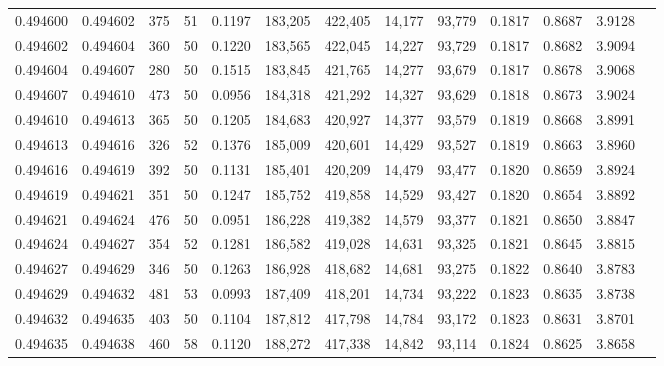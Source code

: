 \begin{tabular}{rrrrrrrrrrrrr}
0.494600 & 0.494602 &   375 &  51 &                                     0.1197 & 183,205 & 422,405 &  14,177 &  93,779 & 0.1817 & 0.8687 & 3.9128 \\
0.494602 & 0.494604 &   360 &  50 &                                     0.1220 & 183,565 & 422,045 &  14,227 &  93,729 & 0.1817 & 0.8682 & 3.9094 \\
0.494604 & 0.494607 &   280 &  50 &                                     0.1515 & 183,845 & 421,765 &  14,277 &  93,679 & 0.1817 & 0.8678 & 3.9068 \\
0.494607 & 0.494610 &   473 &  50 &                                     0.0956 & 184,318 & 421,292 &  14,327 &  93,629 & 0.1818 & 0.8673 & 3.9024 \\
0.494610 & 0.494613 &   365 &  50 &                                     0.1205 & 184,683 & 420,927 &  14,377 &  93,579 & 0.1819 & 0.8668 & 3.8991 \\
0.494613 & 0.494616 &   326 &  52 &                                     0.1376 & 185,009 & 420,601 &  14,429 &  93,527 & 0.1819 & 0.8663 & 3.8960 \\
0.494616 & 0.494619 &   392 &  50 &                                     0.1131 & 185,401 & 420,209 &  14,479 &  93,477 & 0.1820 & 0.8659 & 3.8924 \\
0.494619 & 0.494621 &   351 &  50 &                                     0.1247 & 185,752 & 419,858 &  14,529 &  93,427 & 0.1820 & 0.8654 & 3.8892 \\
0.494621 & 0.494624 &   476 &  50 &                                     0.0951 & 186,228 & 419,382 &  14,579 &  93,377 & 0.1821 & 0.8650 & 3.8847 \\
0.494624 & 0.494627 &   354 &  52 &                                     0.1281 & 186,582 & 419,028 &  14,631 &  93,325 & 0.1821 & 0.8645 & 3.8815 \\
0.494627 & 0.494629 &   346 &  50 &                                     0.1263 & 186,928 & 418,682 &  14,681 &  93,275 & 0.1822 & 0.8640 & 3.8783 \\
0.494629 & 0.494632 &   481 &  53 &                                     0.0993 & 187,409 & 418,201 &  14,734 &  93,222 & 0.1823 & 0.8635 & 3.8738 \\
0.494632 & 0.494635 &   403 &  50 &                                     0.1104 & 187,812 & 417,798 &  14,784 &  93,172 & 0.1823 & 0.8631 & 3.8701 \\
0.494635 & 0.494638 &   460 &  58 &                                     0.1120 & 188,272 & 417,338 &  14,842 &  93,114 & 0.1824 & 0.8625 & 3.8658 \\

\end{tabular}
